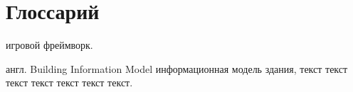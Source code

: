 ﻿\section*{Глоссарий}

\begin{rglossary}
    {игровой фреймворк.}

    {англ. Building Information Model}
    {информационная модель здания, текст {} текст текст текст текст текст текст.}
\end{rglossary}